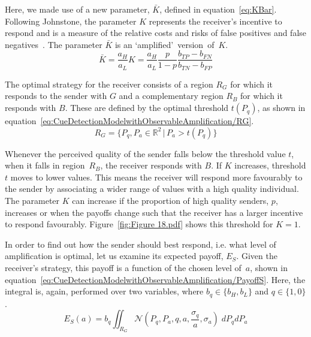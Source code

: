\documentclass[a4paper,12pt]{article}
\numberwithin{equation}{section}
\numberwithin{figure}{section}
\begin{document}
Here, we made use of a new parameter, $\bar{K}$, defined in equation~\ref{eq:KBar}. Following Johnstone, the parameter $K$ represents the receiver's incentive to respond and is a measure of the relative costs and risks of false positives and false negatives~\cite{Johnstone1997}. The parameter $\bar{K}$ is an `amplified'~version~of~$K$.
\begin{equation}
\label{eq:KBar}
\bar{K}=\frac{a_{H}}{a_{L}}K=\frac{a_{H}}{a_{L}}\frac{p}{1-p}\frac{b_{TP}-b_{FN}}{b_{TN}-b_{FP}}
\end{equation}

The optimal strategy for the receiver consists of a region $R_{G}$ for which it responds to the sender with $G$ and a complementary region $R_{B}$ for which it responds with $B$. These are defined by the optimal threshold $t(P_{q})$, as shown in equation~\ref{eq:CueDetectionModelwithObservableAmplification/RG}.
\begin{equation}
\label{eq:CueDetectionModelwithObservableAmplification/RG}
R_{G} = \{P_{q}, P_{a} \in \mathbb{R}^{2} \, | \, P_{a}>t(P_{q})\}
\end{equation}

Whenever the perceived quality of the sender falls below the threshold value $t$, when it falls in region~$R_{B}$, the receiver responds with $B$. If $K$ increases, threshold $t$ moves to lower values. This means the receiver will respond more favourably to the sender by associating a wider range of values with a high quality individual. The parameter $K$ can increase if the proportion of high quality senders, $p$, increases or when the payoffs change such that the receiver has a larger incentive to respond favourably. Figure~\ref{fig:Figure 18.pdf} shows this threshold for $K=1$.

In order to find out how the sender should best respond, i.e. what level of amplification is optimal, let us examine its expected payoff, $E_{S}$. Given the receiver's strategy, this payoff is a function of the chosen level of~$a$, shown in equation~\ref{eq:CueDetectionModelwithObservableAmplification/PayoffS}. Here, the integral is, again, performed over two variables, where $b_{q} \in \{b_{H}, b_{L}\}$ and $q \in \{1, 0\}$.
\begin{equation}
\label{eq:CueDetectionModelwithObservableAmplification/PayoffS}
E_{S}(a) = b_{q} \displaystyle \iint_{R_{G}} \mathcal{N}(P_{q}, P_{a}, q, a, \frac{\sigma_{q}}{a}, \sigma_{a}) \; dP_{q}dP_{a}
\end{equation}
\end{document}
